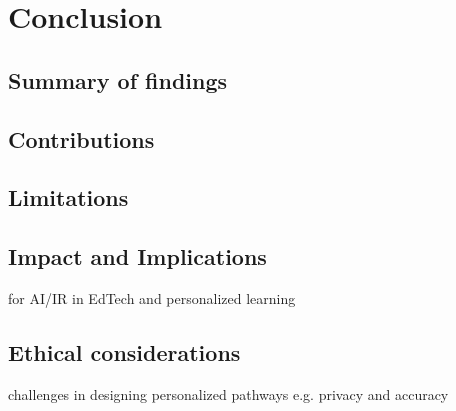 \chapter{Conclusion} \label{chap:chap-7}



\section{Summary of findings}

\section{Contributions}

\section{Limitations}

\section{Impact and Implications}

for AI/IR in EdTech and personalized learning 

\section{Ethical considerations}
challenges in designing personalized pathways e.g. privacy and accuracy 